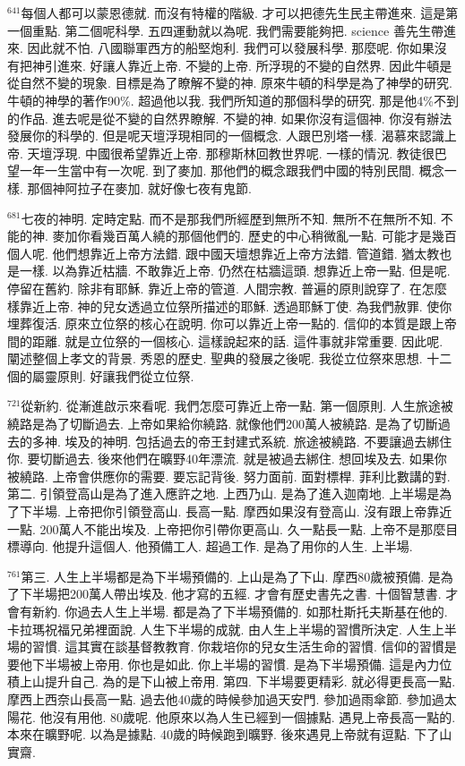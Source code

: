 \documentclass{book}
\begin{document}
$^{641}$每個人都可以蒙恩德就.
而沒有特權的階級.
才可以把德先生民主帶進來.
這是第一個重點.
第二個呢科學.
五四運動就以為呢.
我們需要能夠把.
science 善先生帶進來.
因此就不怕.
八國聯軍西方的船堅炮利.
我們可以發展科學.
那麼呢.
你如果沒有把神引進來.
好讓人靠近上帝.
不變的上帝.
所浮現的不變的自然界.
因此牛頓是從自然不變的現象.
目標是為了瞭解不變的神.
原來牛頓的科學是為了神學的研究.
牛頓的神學的著作90\%.
超過他以我.
我們所知道的那個科學的研究.
那是他4\%不到的作品.
進去呢是從不變的自然界瞭解.
不變的神.
如果你沒有這個神.
你沒有辦法發展你的科學的.
但是呢天壇浮現相同的一個概念.
人跟巴別塔一樣.
渴慕來認識上帝.
天壇浮現.
中國很希望靠近上帝.
那穆斯林回教世界呢.
一樣的情況.
教徒很巴望一年一生當中有一次呢.
到了麥加.
那他們的概念跟我們中國的特別民間.
概念一樣.
那個神阿拉子在麥加.
就好像七夜有鬼節.

$^{681}$七夜的神明.
定時定點.
而不是那我們所經歷到無所不知.
無所不在無所不知.
不能的神.
麥加你看幾百萬人繞的那個他們的.
歷史的中心稍微亂一點.
可能才是幾百個人呢.
他們想靠近上帝方法錯.
跟中國天壇想靠近上帝方法錯.
管道錯.
猶太教也是一樣.
以為靠近枯牆.
不敢靠近上帝.
仍然在枯牆這頭.
想靠近上帝一點.
但是呢.
停留在舊約.
除非有耶穌.
靠近上帝的管道.
人間宗教.
普遍的原則說穿了.
在怎麼樣靠近上帝.
神的兒女透過立位祭所描述的耶穌.
透過耶穌丁使.
為我們赦罪.
使你埋葬復活.
原來立位祭的核心在說明.
你可以靠近上帝一點的.
信仰的本質是跟上帝間的距離.
就是立位祭的一個核心.
這樣說起來的話.
這件事就非常重要.
因此呢.
闡述整個上孝文的背景.
秀恩的歷史.
聖典的發展之後呢.
我從立位祭來思想.
十二個的屬靈原則.
好讓我們從立位祭.

$^{721}$從新約.
從漸進啟示來看呢.
我們怎麼可靠近上帝一點.
第一個原則.
人生旅途被繞路是為了切斷過去.
上帝如果給你繞路.
就像他們200萬人被繞路.
是為了切斷過去的多神.
埃及的神明.
包括過去的帝王封建式系統.
旅途被繞路.
不要讓過去綁住你.
要切斷過去.
後來他們在曠野40年漂流.
就是被過去綁住.
想回埃及去.
如果你被繞路.
上帝會供應你的需要.
要忘記背後.
努力面前.
面對標桿.
菲利比數講的對.
第二.
引領登高山是為了進入應許之地.
上西乃山.
是為了進入迦南地.
上半場是為了下半場.
上帝把你引領登高山.
長高一點.
摩西如果沒有登高山.
沒有跟上帝靠近一點.
200萬人不能出埃及.
上帝把你引帶你更高山.
久一點長一點.
上帝不是那麼目標導向.
他提升這個人.
他預備工人.
超過工作.
是為了用你的人生.
上半場.

$^{761}$第三.
人生上半場都是為下半場預備的.
上山是為了下山.
摩西80歲被預備.
是為了下半場把200萬人帶出埃及.
他才寫的五經.
才會有歷史書先之書.
十個智慧書.
才會有新約.
你過去人生上半場.
都是為了下半場預備的.
如那杜斯托夫斯基在他的.
卡拉瑪祝福兄弟裡面說.
人生下半場的成就.
由人生上半場的習慣所決定.
人生上半場的習慣.
這其實在談基督教教育.
你栽培你的兒女生活生命的習慣.
信仰的習慣是要他下半場被上帝用.
你也是如此.
你上半場的習慣.
是為下半場預備.
這是內力位積上山提升自己.
為的是下山被上帝用.
第四.
下半場要更精彩.
就必得更長高一點.
摩西上西奈山長高一點.
過去他40歲的時候參加過天安門.
參加過雨傘節.
參加過太陽花.
他沒有用他.
80歲呢.
他原來以為人生已經到一個據點.
遇見上帝長高一點的.
本來在曠野呢.
以為是據點.
40歲的時候跑到曠野.
後來遇見上帝就有逗點.
下了山實齋.
\end{document}
